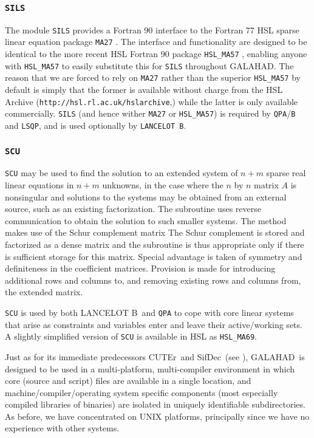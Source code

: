 \documentclass[twoside]{article}
\newcommand{\gal}{{\sf GALAHAD}}
\newcommand{\lanb}{{\sf LANCELOT B}}
\newcommand{\cuter}{{\sf CUTEr}}
\newcommand{\sifdec}{{\sf SifDec}}
\newcommand{\ltsubsubsection}[1]{\subsubsection{{\tt #1}} \label{#1}}
\begin{document}
\ltsubsubsection{SILS}

The module {\tt SILS} provides a Fortran 90 interface to the Fortran 77 HSL
sparse linear equation package {\tt MA27} \cite{DuffReid82}.
The interface and functionality are
designed to be identical to the more recent HSL Fortran 90
package {\tt HSL\_MA57} \cite{Duff01}, enabling anyone with {\tt HSL\_MA57}
to easily substitute this for {\tt SILS} throughout \gal. The reason
that we are forced to rely on {\tt MA27} rather than the superior
{\tt HSL\_MA57} by default is simply that
the former is available without charge from the HSL Archive
({\tt http://hsl.rl.ac.uk/hslarchive},) while the latter is only available
commercially.
{\tt SILS} (and hence wither {\tt MA27} or {\tt HSL\_MA57})
is required by {\tt QPA}/{\tt B} and {\tt LSQP}, and is
used optionally by {\tt LANCELOT B}.

\ltsubsubsection{SCU}

{\tt SCU} may be used to find the solution
to an extended system of $n + m$
sparse real linear equations in $n  +  m$ unknowns,
in the case where the $n$ by $n$ matrix $A$ is nonsingular
and solutions to the systems
may be obtained from an external source, such as an existing
factorization.  The subroutine uses reverse communication to obtain
the solution to such smaller systems.  The method makes use of
the Schur complement matrix
The Schur complement is stored and factorized as a dense matrix
and the subroutine is thus appropriate only if there is
sufficient storage for this matrix. Special advantage is taken
of symmetry and definiteness in the coefficient matrices.
Provision is made for introducing additional rows and columns
to, and removing existing rows and columns from, the extended matrix.

{\tt SCU} is used by both \lanb\ and {\tt QPA} to cope
with core linear systems that arise as constraints and variables
enter and leave their active/working sets. A slightly simplified
version of {\tt SCU} is available in HSL as {\tt HSL\_MA69}.


Just as for its immediate predecessors \cuter\ and \sifdec\
(see ),
\gal\ is designed to be used in a multi-platform, multi-compiler
environment in which core (source and script) files are available
in a single location, and machine/compiler/operating system specific
components (most especially compiled libraries of binaries) are isolated in
uniquely identifiable subdirectories. As before, we have concentrated on
UNIX platforms, principally since we have no experience with other systems.
\end{document}
